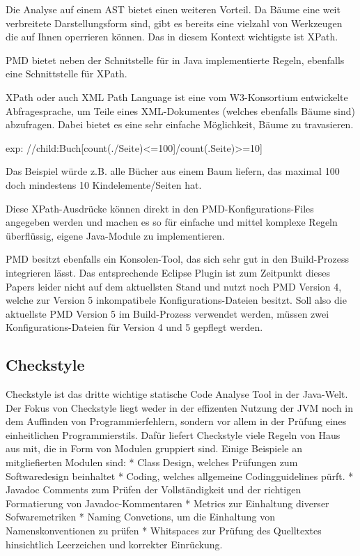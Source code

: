 
Die Analyse auf einem AST bietet einen weiteren Vorteil. Da Bäume eine weit verbreitete Darstellungsform sind, gibt es bereits eine vielzahl von Werkzeugen die auf Ihnen operrieren können. Das in diesem Kontext wichtigste ist XPath.

PMD bietet neben der Schnitstelle für in Java implementierte Regeln, ebenfalls eine Schnittstelle für XPath. 

XPath oder auch XML Path Language ist eine vom W3-Konsortium entwickelte Abfragesprache, um Teile eines XML-Dokumentes (welches ebenfalls Bäume sind) abzufragen. Dabei bietet es eine sehr einfache Möglichkeit, Bäume zu travasieren.

exp: //child:Buch[count(./Seite)<=100]/count(.Seite)>=10]

Das Beispiel würde z.B. alle Bücher aus einem Baum liefern, das maximal 100 doch mindestens 10 Kindelemente/Seiten hat.

Diese XPath-Ausdrücke können direkt in den PMD-Konfigurations-Files angegeben werden und machen es so für einfache und mittel komplexe Regeln überflüssig, eigene Java-Module zu implementieren.

PMD besitzt ebenfalls ein Konsolen-Tool, das sich sehr gut in den Build-Prozess integrieren lässt. Das entsprechende Eclipse Plugin ist zum Zeitpunkt dieses Papers leider nicht auf dem aktuellsten Stand und nutzt noch PMD Version 4, welche zur Version 5 inkompatibele Konfigurations-Dateien besitzt. Soll also die aktuellste PMD Version 5 im Build-Prozess verwendet werden, müssen zwei Konfigurations-Dateien für Version 4 und 5 gepflegt werden.


\subsection{Checkstyle}

Checkstyle ist das dritte wichtige statische Code Analyse Tool in der Java-Welt. Der Fokus von Checkstyle liegt weder in der effizenten Nutzung der JVM noch in dem Auffinden von Programmierfehlern, sondern vor allem in der Prüfung eines einheitlichen Programmierstils. 
Dafür liefert Checkstyle viele Regeln von Haus aus mit, die in Form von Modulen gruppiert sind. Einige Beispiele an mitgliefierten Modulen sind:
* Class Design, welches Prüfungen zum Softwaredesign beinhaltet
* Coding, welches allgemeine Codingguidelines pürft.
* Javadoc Comments zum Prüfen der Vollständigkeit und der richtigen Formatierung von Javadoc-Kommentaren
* Metrics zur Einhaltung diverser Sofwaremetriken
* Naming Convetions, um die Einhaltung von Namenskonventionen zu prüfen
* Whitspaces zur Prüfung des Quelltextes hinsichtlich Leerzeichen und korrekter Einrückung.

